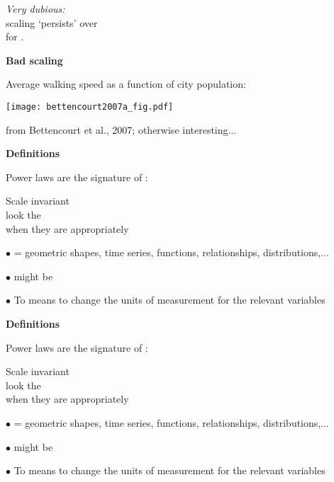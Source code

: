 \textit{Very dubious:}\\ scaling `persists'
over \\
for .




  \textbf{Bad scaling}

Average walking speed as a function of city population:

\texttt{[image: bettencourt2007a\_fig.pdf]}

{\small from Bettencourt et al., 2007; otherwise interesting...}


  \textbf{Definitions}

Power laws are the signature of :

Scale invariant \\
look the \\ 
when they are 
appropriately 

\inv
{\small $\bullet$  = geometric shapes, time series, functions, relationships, distributions,...}

{\small $\bullet$  might be }

{\small $\bullet$ To  means to change the units
of measurement for the relevant variables}


  \textbf{Definitions}

Power laws are the signature of :

Scale invariant \\
look the \\ 
when they are 
appropriately 

{\small $\bullet$  = geometric shapes, time series, functions, relationships, distributions,...}

\inv
{\small $\bullet$  might be }

{\small $\bullet$ To  means to change the units
of measurement for the relevant variables}


